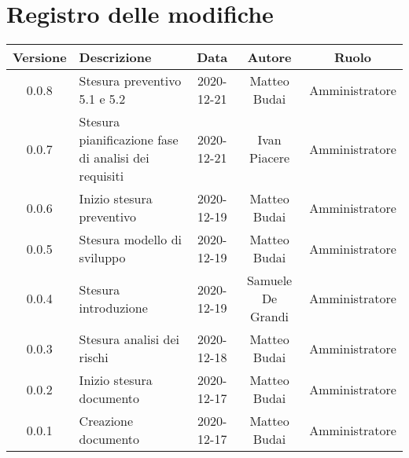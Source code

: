 \section*{Registro delle modifiche}

\begin{center}
	\begin{longtable}{|c|p{5cm}|c|c|c|}
	\hline
	\rowcolor{lighter-grayer}
	\textbf{Versione} & \textbf{Descrizione} & \textbf{Data} & \textbf{Autore} & \textbf{Ruolo} \\
	\hline
	\endfirsthead

	0.0.8 & Stesura preventivo 5.1 e 5.2 & 2020-12-21 & Matteo Budai & Amministratore \\
	\hline
	0.0.7 & Stesura pianificazione fase di analisi dei requisiti & 2020-12-21 & Ivan Piacere & Amministratore \\
	\hline
	0.0.6 & Inizio stesura preventivo & 2020-12-19 & Matteo Budai & Amministratore \\
	\hline
	0.0.5 & Stesura modello di sviluppo & 2020-12-19 & Matteo Budai & Amministratore \\
	\hline
	0.0.4 & Stesura introduzione & 2020-12-19 & Samuele De Grandi & Amministratore \\
	\hline
	0.0.3 & Stesura analisi dei rischi & 2020-12-18 & Matteo Budai & Amministratore \\
	\hline
	0.0.2 & Inizio stesura documento & 2020-12-17 & Matteo Budai & Amministratore \\
	\hline
	0.0.1 & Creazione documento & 2020-12-17 & Matteo Budai & Amministratore \\
	\hline

	\end{longtable}
\end{center}